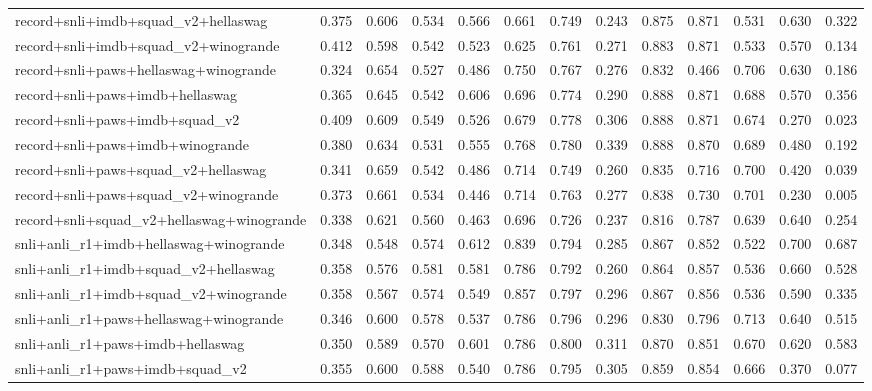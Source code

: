 \begin{table}[t]
\begin{tabular}{lrrrrrrrrrrrr}
    record+snli+imdb+squad\_v2+hellaswag & 0.375 & 0.606 & 0.534 & 0.566 & 0.661 & 0.749 & 0.243 & 0.875 & 0.871 & 0.531 & 0.630 & 0.322 \\
    record+snli+imdb+squad\_v2+winogrande & 0.412 & 0.598 & 0.542 & 0.523 & 0.625 & 0.761 & 0.271 & 0.883 & 0.871 & 0.533 & 0.570 & 0.134 \\
    record+snli+paws+hellaswag+winogrande & 0.324 & 0.654 & 0.527 & 0.486 & 0.750 & 0.767 & 0.276 & 0.832 & 0.466 & 0.706 & 0.630 & 0.186 \\
    record+snli+paws+imdb+hellaswag & 0.365 & 0.645 & 0.542 & 0.606 & 0.696 & 0.774 & 0.290 & 0.888 & 0.871 & 0.688 & 0.570 & 0.356 \\
    record+snli+paws+imdb+squad\_v2 & 0.409 & 0.609 & 0.549 & 0.526 & 0.679 & 0.778 & 0.306 & 0.888 & 0.871 & 0.674 & 0.270 & 0.023 \\
    record+snli+paws+imdb+winogrande & 0.380 & 0.634 & 0.531 & 0.555 & 0.768 & 0.780 & 0.339 & 0.888 & 0.870 & 0.689 & 0.480 & 0.192 \\
    record+snli+paws+squad\_v2+hellaswag & 0.341 & 0.659 & 0.542 & 0.486 & 0.714 & 0.749 & 0.260 & 0.835 & 0.716 & 0.700 & 0.420 & 0.039 \\
    record+snli+paws+squad\_v2+winogrande & 0.373 & 0.661 & 0.534 & 0.446 & 0.714 & 0.763 & 0.277 & 0.838 & 0.730 & 0.701 & 0.230 & 0.005 \\
    record+snli+squad\_v2+hellaswag+winogrande & 0.338 & 0.621 & 0.560 & 0.463 & 0.696 & 0.726 & 0.237 & 0.816 & 0.787 & 0.639 & 0.640 & 0.254 \\
    snli+anli\_r1+imdb+hellaswag+winogrande & 0.348 & 0.548 & 0.574 & 0.612 & 0.839 & 0.794 & 0.285 & 0.867 & 0.852 & 0.522 & 0.700 & 0.687 \\
    snli+anli\_r1+imdb+squad\_v2+hellaswag & 0.358 & 0.576 & 0.581 & 0.581 & 0.786 & 0.792 & 0.260 & 0.864 & 0.857 & 0.536 & 0.660 & 0.528 \\
    snli+anli\_r1+imdb+squad\_v2+winogrande & 0.358 & 0.567 & 0.574 & 0.549 & 0.857 & 0.797 & 0.296 & 0.867 & 0.856 & 0.536 & 0.590 & 0.335 \\
    snli+anli\_r1+paws+hellaswag+winogrande & 0.346 & 0.600 & 0.578 & 0.537 & 0.786 & 0.796 & 0.296 & 0.830 & 0.796 & 0.713 & 0.640 & 0.515 \\
    snli+anli\_r1+paws+imdb+hellaswag & 0.350 & 0.589 & 0.570 & 0.601 & 0.786 & 0.800 & 0.311 & 0.870 & 0.851 & 0.670 & 0.620 & 0.583 \\
    snli+anli\_r1+paws+imdb+squad\_v2 & 0.355 & 0.600 & 0.588 & 0.540 & 0.786 & 0.795 & 0.305 & 0.859 & 0.854 & 0.666 & 0.370 & 0.077 \\

\end{tabular}
\end{table}
